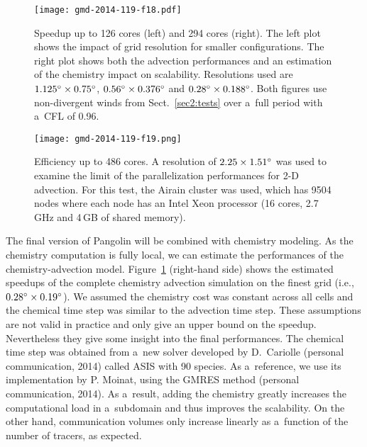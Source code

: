 \begin{figure*}[t]
  \centering
\texttt{[image: gmd-2014-119-f18.pdf]}
  \caption{Speedup up to 126 cores (left) and 294 cores (right).  The left plot
    shows the impact of grid resolution for smaller configurations. The right
    plot shows both the advection performances and an estimation of the
    chemistry impact on scalability. Resolutions used are
    $1.125{^{\circ}}\times0.75^{\circ}$, $0.56{^{\circ}}\times0.376^{\circ}$ and
    $0.28{^{\circ}}\times0.188^{\circ}$. Both figures use non-divergent winds from
    Sect.~\ref{sec2:tests} over a~full period with a~CFL of 0.96.
  }
  \label{fig2:speedup}%
\end{figure*}%

\begin{figure}[t]
  \centering
\texttt{[image: gmd-2014-119-f19.png]}
  \caption{Efficiency up to 486 cores. A resolution of
    $2.25\times1.51^{\circ}$ was used to examine the limit of the parallelization
    performances for 2-D advection. For this test, the Airain cluster was used,
    which has 9504 nodes where each node has an Intel Xeon processor (16 cores,
2.7\,GHz and 4\,GB of shared memory).}
  \label{fig2:efficiency}%
\end{figure}

   The final version of Pangolin will be combined with chemistry modeling. As
   the chemistry computation is fully local, we can estimate the performances of
   the chemistry-advection model. Figure~\ref{fig2:speedup} (right-hand side)
   shows the estimated speedups of the complete chemistry advection simulation
   on the finest grid (i.e., $0.28{^{\circ}} \times 0.19{^{\circ}}$). We assumed
   the chemistry cost was constant across all cells and the chemical time step
   was similar to the advection time step.  These assumptions are not valid in
   practice and only give an upper bound on the speedup. Nevertheless they give
   some insight into the final performances.  The chemical time step was obtained
   from a~new solver developed by D.~Cariolle (personal communication, 2014)
   called ASIS with 90 species. As a~reference, we use its implementation by P.
   Moinat, using the GMRES method (personal communication, 2014). As a~result,
   adding the chemistry greatly increases the computational load in a~subdomain
   and thus improves the scalability. On the other hand, communication volumes
   only increase linearly as a~function of the number of tracers, as expected.

